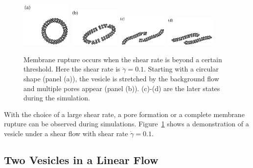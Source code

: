 \documentclass[lineno]{jfm}
\begin{document}
\begin{figure}
\begin{center}
\includegraphics[width=0.22\textwidth]{N58_rupt_0.eps}
\includegraphics[width=0.22\textwidth]{N58_rupt_200.eps}
\includegraphics[width=0.22\textwidth]{N58_rupt_400.eps}
\includegraphics[width=0.22\textwidth]{N58_rupt_600.eps}
\end{center}
  \caption{Membrane rupture occurs when the shear rate is beyond a certain threshold. Here the shear rate is $\dot\gamma = 0.1$. Starting with a circular shape (panel (a)), the vesicle is stretched by the background flow and multiple pores appear (panel (b)). (c)-(d) are the later states during the simulation.
  }
    \label{figure4}
\end{figure}
%

With the choice of a large shear rate, a pore formation or a complete membrane rupture can be observed during simulations. Figure~\ref{figure4} shows a demonstration of a vesicle under a shear flow with shear rate $\dot\gamma=0.1$.





\subsection{Two Vesicles in a Linear Flow}
\end{document}
